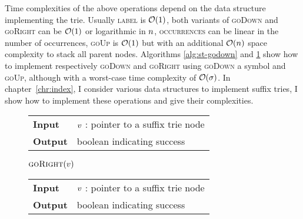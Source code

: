 Time complexities of the above operations depend on the data structure implementing the trie.
Usually \textsc{label} is $\mathcal{O}(1)$, both variants of \textsc{goDown} and \textsc{goRight} can be $\mathcal{O}(1)$ or logarithmic in $n$, \textsc{occurrences} can be linear in the number of occurrences, \textsc{goUp} is $\mathcal{O}(1)$ but with an additional $\mathcal{O}(n)$ space complexity to stack all parent nodes.
Algorithms \ref{alg:st-godown} and \ref{alg:st-goright} show how to implement respectively \textsc{goDown} and \textsc{goRight} using \textsc{goDown} a symbol and \textsc{goUp}, although with a worst-case time complexity of $\mathcal{O}(\sigma)$.
In chapter~\ref{chr:index}, I consider various data structures to implement suffix tries, I show how to implement these operations and give their complexities.

\begin{figure*}[t]
\begin{minipage}[t]{.5\textwidth}
\begin{algorithm}[H]
\begin{tabular}{ll}
\textbf{Input}  & $v$ : pointer to a suffix trie node\\
\textbf{Output} & boolean indicating success\\
\end{tabular}
\begin{algorithmic}[1]
	\State \Return \False
\EndIf
{}
	\State \Return \True
\Else
	\State \Return $\Call{goRight}{\StrieNode}$		
\EndIf
\end{algorithmic}
\label{alg:st-godown}
\end{algorithm}
\end{minipage}
\hfill
\begin{minipage}[t]{.5\textwidth}
\begin{algorithm}[H]
\begin{tabular}{ll}
\textbf{Input}  & $v$ : pointer to a suffix trie node\\
\textbf{Output} & boolean indicating success\\
\end{tabular}
\begin{algorithmic}[1]
			\State \Return \True
		\EndIf
	\EndWhile
\EndIf
\State \Return \False $\phantom{()}$
\end{algorithmic}
\label{alg:st-goright}
\end{algorithm}
\end{minipage}
\end{figure*}


